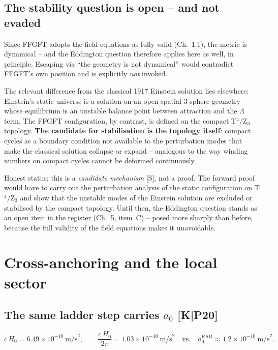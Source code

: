 \documentclass[11pt]{report}
\begin{document}
\section{The stability question is open -- and not evaded}

Since FFGFT adopts the field equations as fully valid (Ch.~1.1),
the metric is dynamical -- and the Eddington question therefore
applies here as well, in principle. Escaping via \enquote{the
geometry is not dynamical} would contradict FFGFT's own position and
is explicitly \emph{not} invoked.

The relevant difference from the classical 1917 Einstein solution
lies elsewhere: Einstein's static universe is a solution on an open
spatial 3-sphere geometry whose equilibrium is an unstable balance
point between attraction and the $\Lambda$ term. The FFGFT
configuration, by contrast, is defined on the compact
T$^4$/Z$_3$ topology. \textbf{The candidate for stabilisation is
the topology itself}: compact cycles as a boundary condition not
available to the perturbation modes that make the classical
solution collapse or expand -- analogous to the way winding numbers
on compact cycles cannot be deformed continuously.

Honest status: this is a \emph{candidate mechanism} [S], not a
proof. The forward proof would have to carry out the perturbation
analysis of the static configuration on T$^4$/Z$_3$ and show that
the unstable modes of the Einstein solution are excluded or
stabilised by the compact topology. Until then, the Eddington
question stands as an open item in the register (Ch.~5, item~C) --
posed more sharply than before, because the full validity of the
field equations makes it unavoidable.

\chapter{Cross-anchoring and the local sector}

\section{The same ladder step carries $a_0$ [K|P20]}

\[
  c\,H_0 = 6.49\times10^{-10}~\text{m/s}^2,
  \qquad
  \frac{c\,H_0}{2\pi} = 1.03\times10^{-10}~\text{m/s}^2
  \quad\text{vs.}\quad
  a_0^\text{RAR} \approx 1.2\times10^{-10}~\text{m/s}^2.
\]
\end{document}
